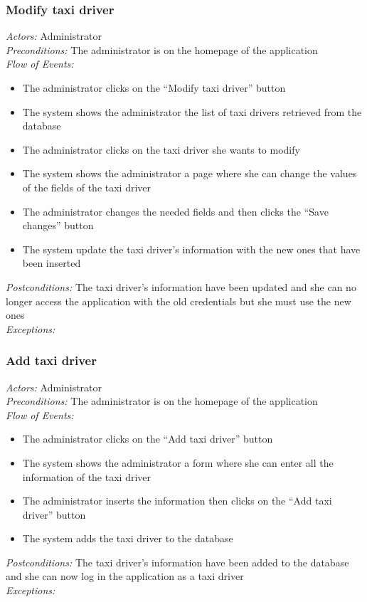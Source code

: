 \documentclass{article}
\begin{document}
\subsubsection{Modify taxi driver}
\textit{Actors:} Administrator
\\\textit{Preconditions:} The administrator is on the homepage of the application
\\\textit{Flow of Events:}
\begin{itemize}
	\item  The administrator clicks on the ``Modify taxi driver'' button
	\item  The system shows the administrator the list of taxi drivers retrieved from the database
	\item  The administrator clicks on the taxi driver she wants to modify
	\item  The system shows the administrator a page where she can change the values of the fields of the taxi driver
	\item  The administrator changes the needed fields and then clicks the ``Save changes'' button
	\item  The system update the taxi driver's information with the new ones that have been inserted
\end{itemize}
\textit{Postconditions:} The taxi driver's information have been updated and she can no longer access the application with the old credentials but she must use the new ones
\\\textit{Exceptions:} 

\subsubsection{Add taxi driver}
\textit{Actors:} Administrator
\\\textit{Preconditions:} The administrator is on the homepage of the application
\\\textit{Flow of Events:}
\begin{itemize}
	\item  The administrator clicks on the ``Add taxi driver'' button
	\item  The system shows the administrator a form where she can enter all the information of the taxi driver %
	\item  The administrator inserts the information then clicks on the ``Add taxi driver'' button
	\item  The system adds the taxi driver to the database
\end{itemize}
\textit{Postconditions:} The taxi driver's information have been added to the database and she can now log in the application as a taxi driver
\\\textit{Exceptions:}
\end{document}
